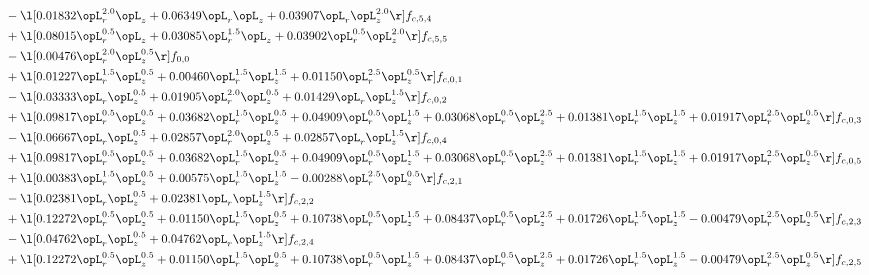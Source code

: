 \begin{alignat}{2}
& - \l[  0.01832 \opL_r^{2.0} \opL_z +  0.06349 \opL_r \opL_z +  0.03907 \opL_r \opL_z^{2.0}  \r] f_{c,5,4} \nonumber \\ 
& + \l[  0.08015 \opL_r^{0.5} \opL_z +  0.03085 \opL_r^{1.5} \opL_z +  0.03902 \opL_r^{0.5} \opL_z^{2.0}  \r] f_{c,5,5} \nonumber \\ 
& - \l[  0.00476 \opL_r^{2.0} \opL_z^{0.5}  \r] f_{0,0} \nonumber \\ 
& + \l[  0.01227 \opL_r^{1.5} \opL_z^{0.5} +  0.00460 \opL_r^{1.5} \opL_z^{1.5} +  0.01150 \opL_r^{2.5} \opL_z^{0.5}  \r] f_{c,0,1} \nonumber \\ 
& - \l[  0.03333 \opL_r \opL_z^{0.5} +  0.01905 \opL_r^{2.0} \opL_z^{0.5} +  0.01429 \opL_r \opL_z^{1.5}  \r] f_{c,0,2} \nonumber \\ 
& + \l[  0.09817 \opL_r^{0.5} \opL_z^{0.5} +  0.03682 \opL_r^{1.5} \opL_z^{0.5} +  0.04909 \opL_r^{0.5} \opL_z^{1.5} +  0.03068 \opL_r^{0.5} \opL_z^{2.5} +  0.01381 \opL_r^{1.5} \opL_z^{1.5} +  0.01917 \opL_r^{2.5} \opL_z^{0.5}  \r] f_{c,0,3} \nonumber \\ 
& - \l[  0.06667 \opL_r \opL_z^{0.5} +  0.02857 \opL_r^{2.0} \opL_z^{0.5} +  0.02857 \opL_r \opL_z^{1.5}  \r] f_{c,0,4} \nonumber \\ 
& + \l[  0.09817 \opL_r^{0.5} \opL_z^{0.5} +  0.03682 \opL_r^{1.5} \opL_z^{0.5} +  0.04909 \opL_r^{0.5} \opL_z^{1.5} +  0.03068 \opL_r^{0.5} \opL_z^{2.5} +  0.01381 \opL_r^{1.5} \opL_z^{1.5} +  0.01917 \opL_r^{2.5} \opL_z^{0.5}  \r] f_{c,0,5} \nonumber \\ 
& + \l[  0.00383 \opL_r^{1.5} \opL_z^{0.5} +  0.00575 \opL_r^{1.5} \opL_z^{1.5}   -0.00288 \opL_r^{2.5} \opL_z^{0.5}  \r] f_{c,2,1} \nonumber \\ 
& - \l[  0.02381 \opL_r \opL_z^{0.5} +  0.02381 \opL_r \opL_z^{1.5}  \r] f_{c,2,2} \nonumber \\ 
& + \l[  0.12272 \opL_r^{0.5} \opL_z^{0.5} +  0.01150 \opL_r^{1.5} \opL_z^{0.5} +  0.10738 \opL_r^{0.5} \opL_z^{1.5} +  0.08437 \opL_r^{0.5} \opL_z^{2.5} +  0.01726 \opL_r^{1.5} \opL_z^{1.5}   -0.00479 \opL_r^{2.5} \opL_z^{0.5}  \r] f_{c,2,3} \nonumber \\ 
& - \l[  0.04762 \opL_r \opL_z^{0.5} +  0.04762 \opL_r \opL_z^{1.5}  \r] f_{c,2,4} \nonumber \\ 
& + \l[  0.12272 \opL_r^{0.5} \opL_z^{0.5} +  0.01150 \opL_r^{1.5} \opL_z^{0.5} +  0.10738 \opL_r^{0.5} \opL_z^{1.5} +  0.08437 \opL_r^{0.5} \opL_z^{2.5} +  0.01726 \opL_r^{1.5} \opL_z^{1.5}   -0.00479 \opL_r^{2.5} \opL_z^{0.5}  \r] f_{c,2,5} \nonumber \\ 

\end{alignat}
